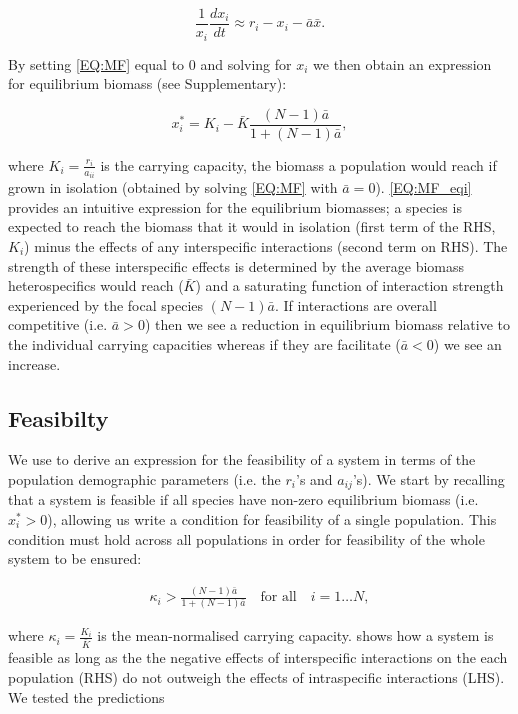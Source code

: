 \documentclass{article}
\begin{document}
\begin{equation} \label{EQ:MF}
    \frac{1}{x_i} \frac{dx_i}{dt} \approx r_i - x_i - \bar{a}\bar{x}.
\end{equation}

By setting \cref{EQ:MF} equal to $0$ and solving for $x_i$ we then obtain an expression for equilibrium biomass (see Supplementary):

\begin{equation}\label{EQ:MF_eqi}
  x^*_i = K_i -  \bar{K}  \frac{ (N-1)\bar{a}}{1 + (N-1)\bar{a}}, 
\end{equation}

where $K_i = \frac{r_i}{a_{ii}}$ is the carrying capacity, the biomass a population would reach if grown in isolation (obtained by solving \cref{EQ:MF} with $\bar{a} = 0$). \cref{EQ:MF_eqi} provides an intuitive expression for the equilibrium biomasses; a species is expected to reach the biomass that it would in isolation (first term of the RHS, $K_i$) minus the effects of any interspecific interactions (second term on RHS). The strength of these interspecific effects is determined by the average biomass heterospecifics would reach ($\bar{K}$) and a saturating function of interaction strength experienced by the focal species $(N-1)\bar{a}$. If interactions are overall competitive (i.e. $ \bar{a} > 0$) then we see a reduction in equilibrium biomass relative to the individual carrying capacities whereas if they are facilitate ($ \bar{a} < 0$) we see an increase.  

\subsection{Feasibilty}
We use  to derive an expression for the feasibility of a system in terms of the population demographic parameters (i.e. the $r_i$'s and $a_{ij}$'s). We start by recalling that a system is feasible if all species have non-zero equilibrium biomass (i.e. $x_i^* > 0 $), allowing us write a condition for feasibility of a single population. This condition must hold across all populations in order for feasibility of the whole system to be ensured:

\begin{align} \label{EQ:Feas_sp}
  \kappa_i > \frac{(N-1)\bar{a}}{1 + (N-1)\bar{a}} \quad \text{for all} \quad i = 1 \ldots N,
\end{align}

where $\kappa_i = \frac{K_i}{\bar{K}}$ is the mean-normalised carrying capacity.  shows how a system is feasible as long as the the negative effects of interspecific interactions on the each population (RHS) do not outweigh the effects of intraspecific interactions (LHS). We tested the predictions 
\end{document}
